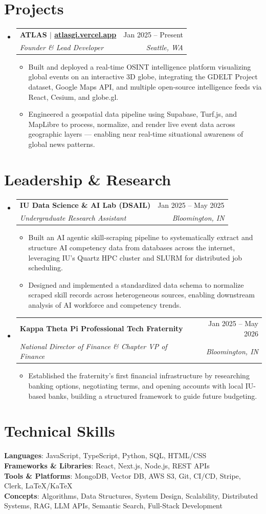 \documentclass[letterpaper,11pt]{article}
\makeatletter
\newcommand{\resumeItem}[1]{\item\small{#1 \vspace{-2pt}}}
\newcommand{\resumeSubheading}[4]{\vspace{-2pt}\item\begin{tabular*}{0.97\textwidth}[t]{l@{\extracolsep{\fill}}r}\textbf{#1} & #2 \\\textit{\small#3} & \textit{\small #4} \\\end{tabular*}\vspace{-7pt}}
\newcommand{\resumeSubHeadingListStart}{\begin{itemize}[leftmargin=0.15in, label={}]}
\newcommand{\resumeSubHeadingListEnd}{\end{itemize}}
\newcommand{\resumeItemListStart}{\begin{itemize}}
\newcommand{\resumeItemListEnd}{\end{itemize}\vspace{-5pt}}
\makeatother
\begin{document}
\section{Projects}
  \resumeSubHeadingListStart
    \resumeSubheading
      {ATLAS $|$ \href{https://atlasgi.vercel.app}{atlasgi.vercel.app}}{Jan 2025 -- Present}
      {Founder \& Lead Developer}{Seattle, WA}
      \resumeItemListStart
        \resumeItem{Built and deployed a real-time OSINT intelligence platform visualizing global events on an interactive 3D globe, integrating the GDELT Project dataset, Google Maps API, and multiple open-source intelligence feeds via React, Cesium, and globe.gl.}
        \resumeItem{Engineered a geospatial data pipeline using Supabase, Turf.js, and MapLibre to process, normalize, and render live event data across geographic layers — enabling near real-time situational awareness of global news patterns.}
      \resumeItemListEnd
  \resumeSubHeadingListEnd

\section{Leadership \& Research}
  \resumeSubHeadingListStart
    \resumeSubheading
      {IU Data Science \& AI Lab (DSAIL)}{Jan 2025 -- May 2025}
      {Undergraduate Research Assistant}{Bloomington, IN}
      \resumeItemListStart
        \resumeItem{Built an AI agentic skill-scraping pipeline to systematically extract and structure AI competency data from databases across the internet, leveraging IU's Quartz HPC cluster and SLURM for distributed job scheduling.}
        \resumeItem{Designed and implemented a standardized data schema to normalize scraped skill records across heterogeneous sources, enabling downstream analysis of AI workforce and competency trends.}
      \resumeItemListEnd
    \resumeSubheading
      {Kappa Theta Pi Professional Tech Fraternity}{Jan 2025 -- May 2026}
      {National Director of Finance \& Chapter VP of Finance}{Bloomington, IN}
      \resumeItemListStart
        \resumeItem{Established the fraternity's first financial infrastructure by researching banking options, negotiating terms, and opening accounts with local IU-based banks, building a structured framework to guide future budgeting.}
      \resumeItemListEnd
  \resumeSubHeadingListEnd

\section{Technical Skills}
 \begin{itemize}[leftmargin=0.15in, label={}]
    \small{\item{
     \textbf{Languages}{: JavaScript, TypeScript, Python, SQL, HTML/CSS} \\
     \textbf{Frameworks \& Libraries}{: React, Next.js, Node.js, REST APIs} \\
     \textbf{Tools \& Platforms}{: MongoDB, Vector DB, AWS S3, Git, CI/CD, Stripe, Clerk, LaTeX/KaTeX} \\
     \textbf{Concepts}{: Algorithms, Data Structures, System Design, Scalability, Distributed Systems, RAG, LLM APIs, Semantic Search, Full-Stack Development}
    }}
 \end{itemize}
\end{document}
